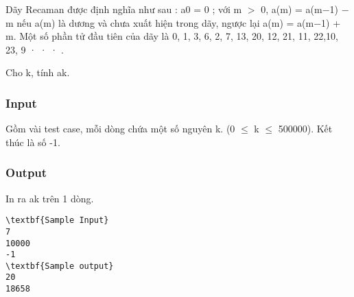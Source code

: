 

Dãy Recaman được định nghĩa như sau : a0 = 0 ; với m $>$ 0, a(m) = a(m−1) − m nếu a(m) là dương và chưa xuất hiện trong dãy, ngược lại a(m) = a(m−1) + m. Một số phần tử đầu tiên của dãy là 0, 1, 3, 6, 2, 7, 13, 20, 12, 21, 11, 22,10, 23, 9 · · · .

Cho k, tính ak.

\subsubsection{Input}

Gồm vài test case, mỗi dòng chứa một số nguyên k. (0 $\le$ k $\le$ 500000). Kết thúc là số -1.

\subsubsection{Output}

In ra ak trên 1 dòng.
\begin{verbatim}
\textbf{Sample Input}
7
10000
-1
\textbf{Sample output}
20
18658
\end{verbatim}
